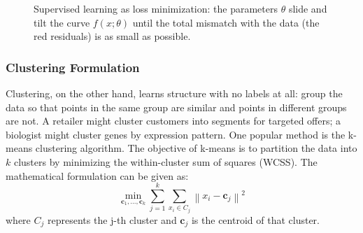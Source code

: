 \begin{figure}[h]
\centering
{}
\caption{Supervised learning as loss minimization: the parameters $\theta$ slide and tilt the curve $f(x;\theta)$ until the total mismatch with the data (the red residuals) is as small as possible.}
\label{fig:ml-loss}
\end{figure}

\subsubsection*{Clustering Formulation}

Clustering, on the other hand, learns structure with no labels at all: group the data so that points in the same group are similar and points in different groups are not.  A retailer might cluster customers into segments for targeted offers; a biologist might cluster genes by expression pattern.  One popular method is the k-means clustering algorithm. The objective of k-means is to partition the data into \( k \) clusters by minimizing the within-cluster sum of squares (WCSS). The mathematical formulation can be given as:
\begin{equation}
\min_{\mathbf{c}_1, \ldots, \mathbf{c}_k} \sum_{j=1}^{k} \sum_{x_i \in C_j} \left\| x_i - \mathbf{c}_j \right\|^2
\end{equation}
where \( C_j \) represents the j-th cluster and \( \mathbf{c}_j \) is the centroid of that cluster.

